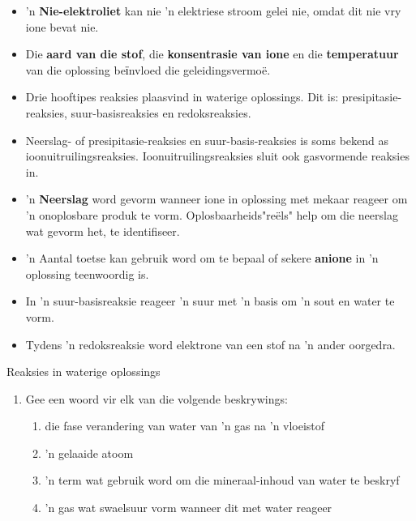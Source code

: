{{\begin{itemize}[noitemsep]
\label{m38719*uid102}\item  'n \textbf{Nie-elektroliet} kan nie   'n elektriese stroom gelei nie, omdat dit nie vry ione bevat nie.
\label{m38719*uid103}\item Die \textbf{aard van die stof}, die \textbf{konsentrasie van ione} en die \textbf{temperatuur} van die oplossing beїnvloed die geleidingsvermo\"{e}.
\label{m38719*uid0253}\item Drie hooftipes reaksies plaasvind in waterige oplossings. Dit is: presipitasie-reaksies, suur-basisreaksies en redoksreaksies.
\label{m38719*uid8923}\item Neerslag- of presipitasie-reaksies en suur-basis-reaksies is soms bekend as ioonuitruilingsreaksies. Ioonuitruilingsreaksies sluit ook gasvormende reaksies in.
\label{m38719*uid104}\item  'n \textbf{Neerslag} word gevorm wanneer ione in oplossing met mekaar reageer om  'n onoplosbare produk te vorm. Oplosbaarheids"re\"{e}ls" help om die neerslag wat gevorm het, te identifiseer.
\label{m38719*uid105}\item  'n Aantal toetse kan gebruik word om te bepaal of sekere \textbf{anione} in  'n oplossing teenwoordig is.
\label{m38719*id813}\item In  'n suur-basisreaksie reageer  'n suur met  'n basis om 'n sout en water te vorm.
\label{m38719*uid823}\item Tydens  'n redoksreaksie word elektrone van een stof na  'n ander oorgedra. 
\end{itemize}
\label{m38719*eip-896}
            \begin{eocexercises}{Reaksies in waterige oplossings}
            \nopagebreak
            \label{m38719*id342869}\begin{enumerate}[noitemsep, label=\textbf{\arabic*}. ] 
            \label{m38719*uid107}\item Gee een woord vir elk van die volgende beskrywings:
\label{m38719*id342885}\begin{enumerate}[noitemsep, label=\textbf{\alph*}. ] 
            \label{m38719*uid108}\item die fase verandering van water van  'n gas na  'n vloeistof
\label{m38719*uid109}\item  'n gelaaide atoom
\label{m38719*uid110}\item  'n term wat gebruik word om die mineraal-inhoud van water te beskryf
\label{m38719*uid111}\item  'n gas wat swaelsuur vorm wanneer dit met water reageer

\end{enumerate}
\end{enumerate}
\end{eocexercises}}}
